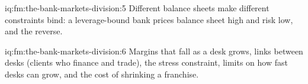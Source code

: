 \begin{solution}{iq:fm:the-bank-markets-division:5}
Different balance sheets make different constraints bind: a leverage-bound bank prices balance sheet high and risk low, and the reverse.
\end{solution}

\begin{solution}{iq:fm:the-bank-markets-division:6}
Margins that fall as a desk grows, links between desks (clients who finance and trade), the stress constraint, limits on how fast desks can grow,
and the cost of shrinking a franchise.
\end{solution}
